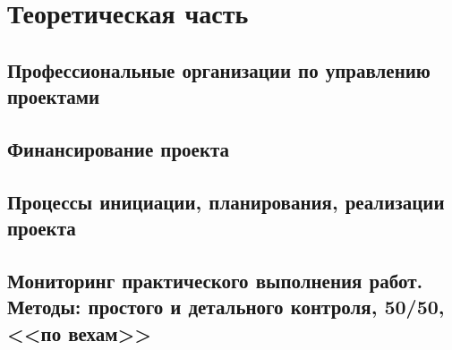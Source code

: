 \section{Теоретическая часть}
\subsection{Профессиональные организации по управлению проектами}



\subsection{Финансирование проекта}

\subsection{Процессы инициации, планирования, реализации проекта}

\subsection{Мониторинг практического выполнения работ. Методы: простого и детального контроля, 50/50, <<по вехам>>}